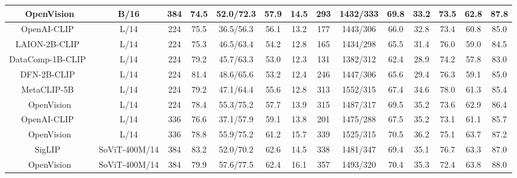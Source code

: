 \begin{table}[t!]
{\begin{tabular}{c|c|c|c|c|c|c|c|c|c|c|c|c|c}
    \rowcolor{cyan!10}\textsf{OpenVision} & \cellcolor{cyan!10}B/16 & \cellcolor{cyan!10}384
    &\cellcolor{cyan!10}74.5
    &\cellcolor{cyan!10}52.0/72.3
    &57.9
    &14.5
    &293
    &1432/333
    &69.8
    &33.2
    &73.5
    &62.8
    &87.8\\
    \midrule
    OpenAI-CLIP~\citep{radford2021clip} & L/14 & 224
    &75.5  &36.5/56.3
    &56.1
    &13.2
    &177
    &1443/306
    &66.0
    &32.8
    &73.4
    &60.8
    &85.0\\
    LAION-2B-CLIP~\citep{openclip} & L/14 & 224  &75.3 &46.5/63.4
    &54.2
    &12.8
    &165
    &1434/298
    &65.5
    &31.4
    &76.0
    &59.0
    &84.5\\
    DataComp-1B-CLIP~\citep{gadre2023datacomp} & L/14 & 224  &79.2&45.7/63.3
    &53.0
    &12.3
    &131
    &1382/312
    &62.4
    &28.9
    &74.2
    &57.8
    &83.0\\
    DFN-2B-CLIP~\citep{dfn} & L/14 & 224&81.4 &48.6/65.6
    &53.2
    &12.4
    &246
    &1447/306
    &65.6
    &29.4
    &76.3
    &59.1
    &85.0\\
    MetaCLIP-5B~\citep{metaclip} & L/14 & 224&79.2 &47.1/64.4
    &55.6
    &12.8
    &313
    &1552/315
    &67.4
    &34.6
    &78.0
    &61.3
    &85.4\\
    \rowcolor{cyan!10} \textsf{OpenVision} & \cellcolor{cyan!10}L/14 & \cellcolor{cyan!10}224 &\cellcolor{cyan!10}78.4  & \cellcolor{cyan!10}55.3/75.2
    &57.7
    &13.9
    &315
    &1487/317
    &69.5
    &35.2
    &73.6
    &62.9
    &86.4\\
    \midrule
     OpenAI-CLIP~\citep{radford2021clip} & L/14 &336
     &76.6 &37.1/57.9
     &59.1
    &13.8
    &201
    &1475/288
    &67.5
    &35.2
    &73.1
    &61.1
    &85.7
    \\
    \rowcolor{cyan!10} \textsf{OpenVision} & \cellcolor{cyan!10}L/14 & \cellcolor{cyan!10}336 &78.8 &55.9/75.2 &61.2
    &15.7
    &339
    &1525/315
    &70.5
    &36.2
    &75.1
    &63.7
    &87.2
\\
     \midrule
     SigLIP~\citep{zhai2023sigmoid} &SoViT-400M/14 &384
     &83.2 &52.0/70.2
     &62.6
&14.5
&338
&1481/347
&69.4
&35.1
&76.7
&63.3
&87.0 \\
   \rowcolor{cyan!10} \textsf{OpenVision} & SoViT-400M/14 &384 & 79.9  & 57.6/77.5
    &62.4
&16.1
&357
&1493/320
&70.4
&35.3
&72.4
&63.8
&88.0\\
    \bottomrule
    \end{tabular}}
    \vspace{-.5em}
\end{table}
